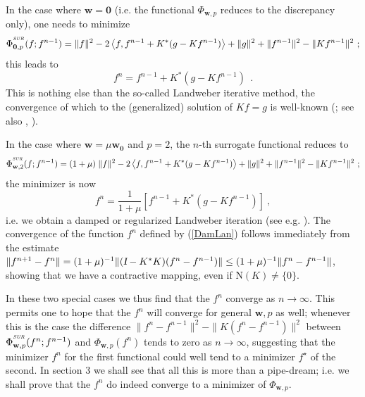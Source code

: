 \documentclass[10pt]{article}
\def\I{\sl {I}}
\def\mN{\mbox{N}}
\def\K{K^*}
\def\SUR{\mbox{\tiny{\it{SUR}}}}
\begin{document}
In the case where $\mathbf{w}=\mathbf{0}$ (i.e. the functional
$\Phi_{\mathbf{w},p}$ reduces to the discrepancy only), one needs to
minimize
$$
{\Phi}^{^{\SUR}}_{\mathbf{0},p}(f ; f^{n-1})=\|f\|^2-2\left<f,
f^{n-1} + \K (g - K f^{n-1}) \right> +\|g\|^2 + \|f^{n-1}\|^2 - \|Kf^{n-1}\|^2
~;
$$
this leads to
\begin{equation*}
f^{n} = f^{n-1} + \K (g - Kf^{n-1})~~.
\end{equation*}
 This is
nothing else than the so-called Landweber iterative method, the convergence of
which  to the (generalized) solution of
$Kf=g$ is well-known (\cite{Lad51}; see also \cite{Ber98},
\cite{Eng96}).

In the case where $\mathbf{w}=\mu \mathbf{w_0}$ and $p=2$,
the $n$-th surrogate functional reduces to
$$
{\Phi}^{^{\SUR}}_{\mathbf{w},2}(f ; f^{n-1})=(1+\mu)\;
\|f\|^2-2\left<f,f^{n-1} + \K (g - K f^{n-1}) \right> +\|g\|^2 +
\|f^{n-1}\|^2 -
\|Kf^{n-1}\|^2 ~;
$$
the minimizer is now
\begin{equation}
\label{DamLan}
f^n = \frac{1}{1+\mu} \left[ f^{n-1} +\K (g -K f^{n-1}) \right] ~,
\end{equation}
i.e. we obtain a damped or regularized Landweber iteration
(see e.g. \cite{Ber98}). The convergence of the function $f^n$ defined by
(\ref{DamLan}) follows immediately from the estimate
$\|f^{n+1}-f^n\| = (1+\mu)^{-1} \|(\mbox{\I}-\K K)(f^n-f^{n-1})\|
\leq (1+\mu)^{-1} \|f^n -f^{n-1}\|$, showing that we have a contractive
mapping,
even if $\mN(K) \neq \{0\}$.

In these two special cases we thus find that the $f^n$ converge as
$n \rightarrow \infty$. This permits one to hope that the $f^n$ will
converge for general $\mathbf{w}, p$ as well; whenever this is the
case the difference
$\|f^{n}-f^{n-1}\|^2 - \|K(f^{n}-f^{n-1})\|^2$ between
${\Phi}^{^{\SUR}}_{\mathbf{w},p}(f^n ; f^{n-1})$ and
$\Phi_{\mathbf{w},p}(f^n)$ tends to zero as $n \rightarrow \infty$,
suggesting that the minimizer
$f^n$ for the first functional could well tend to a minimizer
$f^\star$ of the second.
In section 3 we shall see that all this is more than a pipe-dream; i.e. we
shall prove that the $f^n$ do indeed converge to a minimizer  of
$\Phi_{\mathbf{w},p}$.
\end{document}
